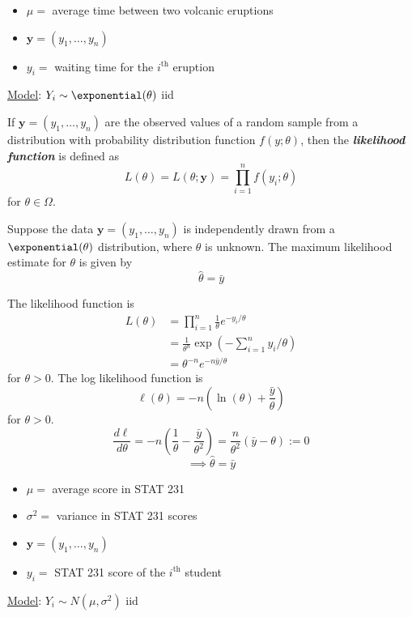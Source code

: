 \begin{Example}{}{}
    \begin{itemize}
        \item $ \mu= $ average time between two volcanic eruptions
        \item $ \symbf{y}=(y_1,\ldots ,y_n) $
        \item $ y_i= $ waiting time for the $ i^{\text{th}} $ eruption
    \end{itemize}
    \underline{Model}: $ Y_i \sim \exponential(\theta) $ iid
\end{Example}



\begin{Definition}{}{}
    If $ \symbf{y}=(y_1,\ldots ,y_n) $ are the observed values of a random sample from a distribution with
    probability distribution function $ f(y;\theta) $, then the \textbf{\emph{likelihood function}}
    is defined as
    \[ L(\theta)=L(\theta;\symbf{y})=\prod_{i=1}^n f(y_i;\theta) \]
    for $ \theta\in\Omega $.
\end{Definition}



\begin{Proposition}{}{}
    Suppose the data $ \symbf{y}=(y_1,\ldots ,y_n) $ is independently
    drawn from a $ \exponential(\theta) $ distribution, where $ \theta $ is unknown.
    The maximum likelihood estimate for $ \theta $ is given by
    \[ \hat{\theta}=\bar{y} \]
\end{Proposition}

\begin{Proof}{}{}
    The likelihood function is
    \begin{align*}
        L(\theta)
         & =\prod_{i=1}^n \frac{1}{\theta} e^{-y_i/\theta}                        \\
         & =\frac{1}{\theta^n} \exp\left(-\sum\limits_{i=1}^{n} y_i/\theta\right) \\
         & =\theta^{-n}e^{-n\bar{y}/\theta}
    \end{align*}
    for $ \theta>0 $. The log likelihood function is
    \[ \ell(\theta)=-n\left( \ln(\theta)+\frac{\bar{y}}{\theta} \right) \]
    for $ \theta>0 $.
    \[ \frac{d\ell}{d\theta} =-n\left( \frac{1}{\theta} -\frac{\bar{y}}{\theta^2} \right)=
        \frac{n}{\theta^2} \left( \bar{y}-\theta \right):=0 \]
    \[ \implies \hat{\theta}=\bar{y} \]
\end{Proof}


\begin{Example}{}{}
    \begin{itemize}
        \item $ \mu = $ average score in STAT 231
        \item $ \sigma^2= $ variance in STAT 231 scores
        \item $ \symbf{y}=(y_1,\ldots ,y_n) $
        \item $ y_i= $ STAT 231 score of the $ i^{\text{th}} $ student
    \end{itemize}
    \underline{Model}: $ Y_i \sim N(\mu,\sigma^2) $ iid
\end{Example}



